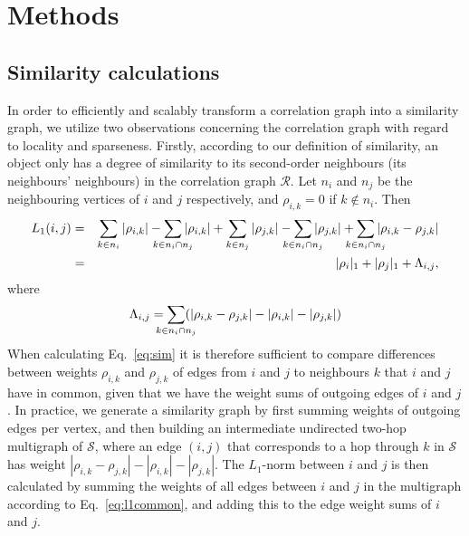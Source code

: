 \documentclass{kais}
\newcommand{\rn}[1]{\rho_{#1}}
\newcommand{\rns}[1]{|\rn{#1}|_1}
\newcommand{\nm}[1]{L_1(#1)}
\begin{document}
\section{Methods}
\label{sec:methods}

\subsection{Similarity calculations}
\label{sec:similaritycalculations}

In order to efficiently and scalably transform a correlation graph into a similarity graph, we utilize two observations
concerning the correlation graph with regard to locality and sparseness. 
Firstly, according to our definition of similarity, an object only has a degree of similarity to its second-order
neighbours (its neighbours' neighbours) in the
correlation graph $\mathcal{R}$. Let $n_i$ and $n_j$ be the neighbouring vertices of $i$ and $j$ respectively, and $\rn{i,
k} = 0$ if $k \not\in n_i$. Then
\begin{eqnarray}
\nm{i,j}  & = &
\sum_{k \in n_i}  |\rn{i, k}| -  \sum_{\mathclap{k \in n_i \cap n_j}}  |\rn{i, k}|
+  \sum_{k \in n_j}  |\rn{j, k}| -  \sum_{\mathclap{k \in n_i \cap n_j}}  |\rn{j, k}|
+  \sum_{\mathclap{k \in n_i \cap n_j}} |\rn{i, k} - \rn{j, k}| \notag\\
& = & \rns{i} + \rns{j} + \Lambda_{i,j}, 
\label{eq:l1terms}
\end{eqnarray}
where
\begin{equation}
\Lambda_{i,j} = \sum_{\mathclap{k \in n_i \cap n_j}} (|\rn{i, k} - \rn{j, k}| - |\rn{i, k}| - |\rn{j, k}|)
\label{eq:l1common}
\end{equation}
When calculating Eq.\ \ref{eq:sim} it is therefore sufficient to compare differences between weights $\rn{i, k}$ and
$\rn{j, k}$ of edges from $i$ and $j$ to neighbours $k$ that $i$ and $j$ have in common, given that we have the weight
sums of outgoing edges of $i$ and $j$.
In practice, we generate a similarity graph by first summing weights of outgoing edges per vertex, and then building an
intermediate undirected two-hop multigraph of $\mathcal{S}$, where an edge $(i, j)$ that corresponds to a hop through
$k$ in $\mathcal{S}$ has weight $|\rn{i, k} - \rn{j, k}| - |\rn{i, k}| - |\rn{j, k}|$. The $L_1$-norm between $i$ and
$j$ is then calculated by summing the weights of all edges between $i$ and $j$ in the multigraph according to Eq.\
\ref{eq:l1common}, and adding this to the edge weight sums of $i$ and $j$.
\end{document}
